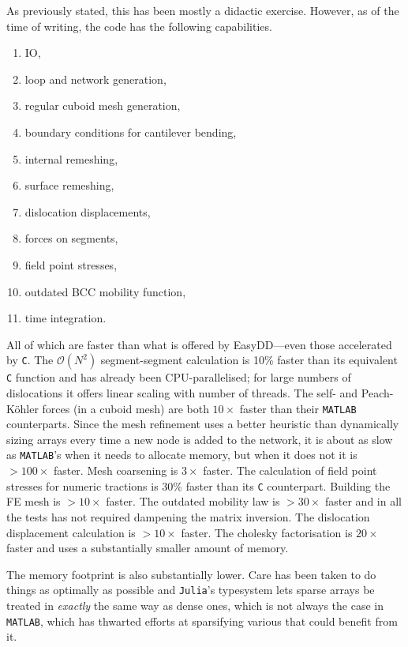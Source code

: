 As previously stated, this has been mostly a didactic exercise. However, as of the time of writing, the code has the following capabilities.
\begin{enumerate}
    \item IO,
    \item loop and network generation,
    \item regular cuboid mesh generation,
    \item boundary conditions for cantilever bending,
    \item internal remeshing,
    \item surface remeshing,
    \item dislocation displacements,
    \item forces on segments,
    \item field point stresses,
    \item outdated BCC mobility function,
    \item time integration.
\end{enumerate}

All of which are faster than what is offered by EasyDD---even those accelerated by \texttt{C}. The $\mathcal{O}(N^2)$ segment-segment calculation is 10\% faster than its equivalent \texttt{C} function and has already been CPU-parallelised; for large numbers of dislocations it offers linear scaling with number of threads. The self- and Peach-K\"{o}hler forces (in a cuboid mesh) are both $10\times$ faster than their \texttt{MATLAB} counterparts. Since the mesh refinement uses a better heuristic than dynamically sizing arrays every time a new node is added to the network, it is about as slow as \texttt{MATLAB}'s when it needs to allocate memory, but when it does not it is $>100\times$ faster. Mesh coarsening is $3\times$ faster. The calculation of field point stresses for numeric tractions is $30\%$ faster than its \texttt{C} counterpart. Building the FE mesh is $>10\times$ faster. The outdated mobility law is $>30\times$ faster and in all the tests has not required dampening the matrix inversion. The dislocation displacement calculation is $>10\times$ faster. The cholesky factorisation is $20\times$ faster and uses a substantially smaller amount of memory.

The memory footprint is also substantially lower. Care has been taken to do things as optimally as possible and \texttt{Julia}'s typesystem lets sparse arrays be treated in \emph{exactly} the same way as dense ones, which is not always the case in \texttt{MATLAB}, which has thwarted efforts at sparsifying various that could benefit from it.


